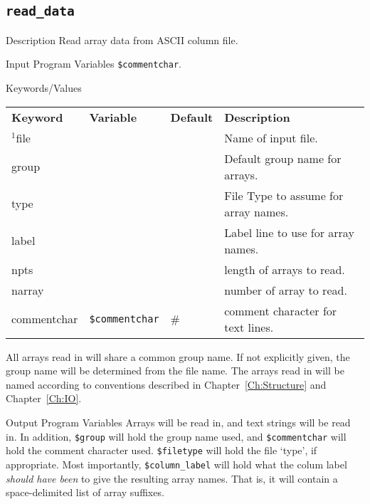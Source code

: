 \relax\par\vfill
\subsection{\texttt{read\_data}} %
    \label{Ch:Command:read-data}

\begin{IFFcom}
\item[Description] Read array data from ASCII column file.
\item[Input Program Variables] {\tt{\$commentchar}}.
\item[Keywords/Values]     {\hspace{1.in} \par\noindent\relax}

  \begin{tabular}{llll}
    \textbf{Keyword} & \textbf{Variable} & \textbf{Default} &
    \textbf{Description}\\
    \noalign{\smallskip}
    ${}^{1}${file}   & & & {Name of input file.} \\ 
    {group}          & & & {Default group name for arrays.} \\ 
    {type}           & & & {File Type to assume for array names.} \\ 
    {label}          & & & {Label line to use for array names.} \\ 
    npts             & & & {length of arrays to read.}\\
    narray           & & & {number of array to read.}\\
    commentchar      &  {\tt{\$commentchar}} & {\#} &
        comment character for text lines.\\
  \end{tabular}

  {\relax \vspace{0.2truein}\relax}
  \noindent
  All arrays read in will share a common group name.  If not explicitly
  given, the group name will be determined from the file name.  The arrays
  read in will be named according to conventions described in
  Chapter~{\ref{Ch:Structure}} and Chapter~{\ref{Ch:IO}}.
  
\item[Output Program Variables] Arrays will be read in, and text strings
  will be read in.  In addition, {\tt{\$group}} will hold the group name
  used, and {\tt{\$commentchar}} will hold the comment character used.
  {\tt{\$filetype}} will hold the file `type', if appropriate.  Most
  importantly, {\tt{\$column\_label}} will hold what the colum label
  {\emph{should have been}} to give the resulting array names.  That is, it
  will contain a space-delimited list of array suffixes.
  

\end{IFFcom}
